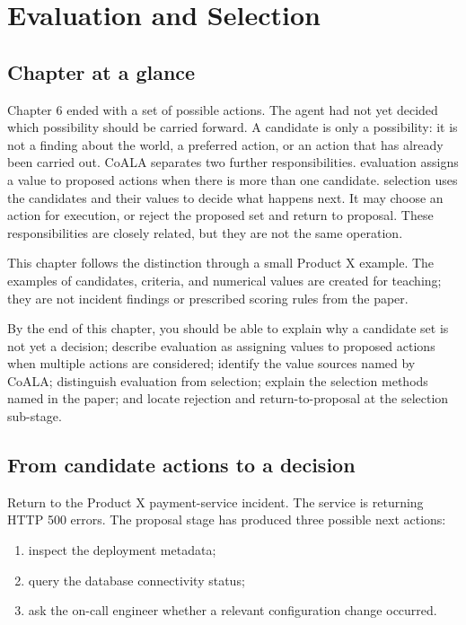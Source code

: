 \chapter{Evaluation and Selection}
\label{ch:evaluation-selection}

\section*{Chapter at a glance}
{}

Chapter 6 ended with a set of possible actions. The agent had not yet decided which possibility should be carried forward. A candidate is only a possibility: it is not a finding about the world, a preferred action, or an action that has already been carried out. CoALA separates two further responsibilities. {\gls{evaluation}} assigns a value to proposed actions when there is more than one candidate. {\gls{selection}} uses the candidates and their values to decide what happens next. It may choose an action for execution, or reject the proposed set and return to proposal. These responsibilities are closely related, but they are not the same operation.

This chapter follows the distinction through a small Product X example. The examples of candidates, criteria, and numerical values are created for teaching; they are not incident findings or prescribed scoring rules from the paper.

\begin{learningbox}
By the end of this chapter, you should be able to explain why a candidate set is not yet a decision; describe evaluation as assigning values to proposed actions when multiple actions are considered; identify the value sources named by CoALA; distinguish evaluation from selection; explain the selection methods named in the paper; and locate rejection and return-to-proposal at the selection sub-stage.
\end{learningbox}

\section{From candidate actions to a decision}
\label{sec:evaluation-from-candidates}

Return to the Product X payment-service incident. The service is returning HTTP 500 errors. The proposal stage has produced three possible next actions:

\begin{enumerate}
  \item inspect the deployment metadata;
  \item query the database connectivity status;
  \item ask the on-call engineer whether a relevant configuration change occurred.
\end{enumerate}

